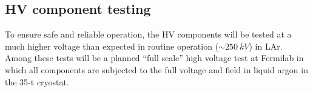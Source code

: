 \subsection{HV component testing}

To ensure safe and reliable operation, the HV components will be
tested at a much higher voltage than expected in routine operation
($\sim\SI{250}{kV}$) in LAr. Among these tests will be a planned
``full scale'' high voltage test at Fermilab in which all components
are subjected to the full voltage and field in liquid argon in the
35-t cryostat. 
